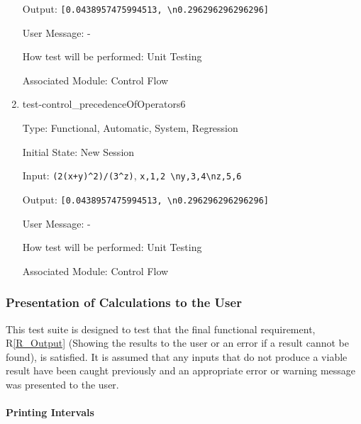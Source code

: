 \documentclass[12pt, titlepage]{article}
\newcommand{\rref}[1]{R\ref{#1}}
\begin{document}
\begin{enumerate}
	Output: \texttt{[0.0438957475994513, \textbackslash n0.296296296296296]}
	
	User Message: - 
	
	How test will be performed: Unit Testing
	
	Associated Module: Control Flow\\
	
	\item{test-control\_precedenceOfOperators6}
	
	Type: Functional, Automatic, System, Regression
	
	Initial State: New Session
	
	Input: \texttt{(2(x+y)\textasciicircum2)/(3\textasciicircum z)}, 
	\texttt{x,1,2 \textbackslash ny,3,4\textbackslash nz,5,6}
	
	Output: \texttt{[0.0438957475994513, \textbackslash n0.296296296296296]}
	
	User Message: - 
	
	How test will be performed: Unit Testing
	
	Associated Module: Control Flow\\
	
\end{enumerate}

\subsubsection{Presentation of Calculations to the User}
\label{tests_outputResults}
This test suite is designed to test that the final functional requirement, 
\rref{R_Output} (Showing the results to the user or an error if a result cannot 
be found), is satisfied. It is assumed that any 
inputs that do not produce a viable result have been caught previously and an 
appropriate error or warning message was presented to the user.

\paragraph{Printing Intervals}
\end{document}
